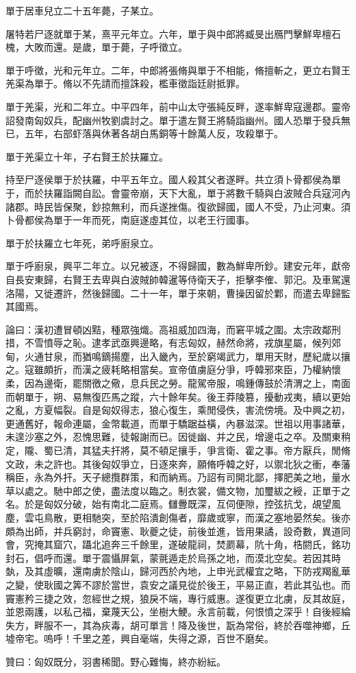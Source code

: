 \begin{pinyinscope}
單于居車兒立二十五年薨，子某立。

屠特若尸逐就單于某，熹平元年立。六年，單于與中郎將臧旻出鴈門擊鮮卑檀石槐，大敗而還。是歲，單于薨，子呼徵立。

單于呼徵，光和元年立。二年，中郎將張脩與單于不相能，脩擅斬之，更立右賢王羌渠為單于。脩以不先請而擅誅殺，檻車徵詣廷尉抵罪。

單于羌渠，光和二年立。中平四年，前中山太守張純反畔，遂率鮮卑寇邊郡。靈帝詔發南匈奴兵，配幽州牧劉虞討之。單于遣左賢王將騎詣幽州。國人恐單于發兵無已，五年，右部虾落與休著各胡白馬銅等十餘萬人反，攻殺單于。

單于羌渠立十年，子右賢王於扶羅立。

持至尸逐侯單于於扶羅，中平五年立。國人殺其父者遂畔。共立須卜骨都侯為單于，而於扶羅詣闕自訟。會靈帝崩，天下大亂，單于將數千騎與白波賊合兵寇河內諸郡。時民皆保聚，鈔掠無利，而兵遂挫傷。復欲歸國，國人不受，乃止河東。須卜骨都侯為單于一年而死，南庭遂虛其位，以老王行國事。

單于於扶羅立七年死，弟呼廚泉立。

單于呼廚泉，興平二年立。以兄被逐，不得歸國，數為鮮卑所鈔。建安元年，獻帝自長安東歸，右賢王去卑與白波賊帥韓暹等侍衛天子，拒擊李傕、郭汜。及車駕還洛陽，又徙遷許，然後歸國。二十一年，單于來朝，曹操因留於鄴，而遣去卑歸監其國焉。

論曰：漢初遭冒頓凶黠，種眾強熾。高祖威加四海，而窘平城之圍。太宗政鄰刑措，不雪憤辱之恥。逮孝武亟興邊略，有志匈奴，赫然命將，戎旗星屬，候列郊甸，火通甘泉，而猶鳴鏑揚塵，出入畿內，至於窮竭武力，單用天財，歷紀歲以攘之。寇雖頗折，而漢之疲耗略相當矣。宣帝值虜庭分爭，呼韓邪來臣，乃權納懷柔，因為邊衛，罷關徼之儆，息兵民之勞。龍駕帝服，鳴鍾傳鼓於清渭之上，南面而朝單于，朔、易無復匹馬之蹤，六十餘年矣。後王莽陵篡，擾動戎夷，續以更始之亂，方夏幅裂。自是匈奴得志，狼心復生，乘閒侵佚，害流傍境。及中興之初，更通舊好，報命連屬，金幣載道，而單于驕踞益橫，內暴滋深。世祖以用事諸華，未遑沙塞之外，忍愧思難，徒報謝而已。因徙幽、并之民，增邊屯之卒。及關東稍定，隴、蜀已清，其猛夫扞將，莫不頓足攘手，爭言衛、霍之事。帝方厭兵，閒脩文政，未之許也。其後匈奴爭立，日逐來奔，願脩呼韓之好，以禦北狄之衝，奉藩稱臣，永為外扞。天子總攬群策，和而納焉。乃詔有司開北鄙，擇肥美之地，量水草以處之。馳中郎之使，盡法度以臨之。制衣裳，備文物，加璽紱之綬，正單于之名。於是匈奴分破，始有南北二庭焉。讎釁既深，互伺便隙，控弦抗戈，覘望風塵，雲屯鳥散，更相馳突，至於陷潰創傷者，靡歲或寧，而漢之塞地晏然矣。後亦頗為出師，并兵窮討，命竇憲、耿夔之徒，前後並進，皆用果譎，設奇數，異道同會，究掩其窟穴，躡北追奔三千餘里，遂破龍祠，焚罽幕，阬十角，梏閼氏，銘功封石，倡呼而還。單于震懾屏氣，蒙氈遁走於烏孫之地，而漠北空矣。若因其時埶，及其虛曠，還南虜於陰山，歸河西於內地，上申光武權宜之略，下防戎羯亂華之變，使耿國之筭不謬於當世，袁安之議見從於後王，平易正直，若此其弘也。而竇憲矜三捷之效，忽經世之規，狼戾不端，專行威惠。遂復更立北虜，反其故庭，並恩兩護，以私己福，棄蔑天公，坐樹大鯁。永言前載，何恨憤之深乎！自後經綸失方，畔服不一，其為疢毒，胡可單言！降及後世，翫為常俗，終於吞噬神鄉，丘墟帝宅。嗚呼！千里之差，興自毫端，失得之源，百世不磨矣。

贊曰：匈奴既分，羽書稀聞。野心難悔，終亦紛紜。


\end{pinyinscope}